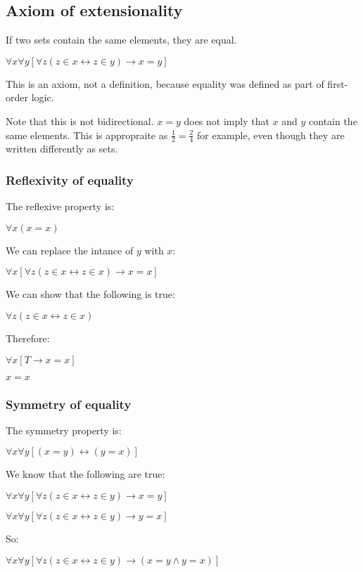
\subsection{Axiom of extensionality}

If two sets contain the same elements, they are equal.

$\forall x \forall y[\forall z(z\in x \leftrightarrow z\in y)\rightarrow x=y]$

This is an axiom, not a definition, because equality was defined as part of first-order logic.

Note that this is not bidirectional. \(x=y\) does not imply that \(x\) and \(y\) contain the same elements. This is appropraite as \(\frac{1}{2}= \frac{2}{4}\) for example, even though they are written differently as sets.

\subsubsection{Reflexivity of equality}

The reflexive property is:

$\forall x(x=x)$

We can replace the intance of \(y\)  with \(x\):

$\forall x [\forall z(z\in x \leftrightarrow z\in x)\rightarrow x=x]$

We can show that the following is true:

$\forall z(z\in x \leftrightarrow z\in x)$

Therefore:

$\forall x [T \rightarrow x=x]$

\(x=x\)

\subsubsection{Symmetry of equality}

The symmetry property is:

$\forall x \forall y[(x=y)\leftrightarrow (y=x)]$

We know that the following are true:

$\forall x \forall y[\forall z(z\in x \leftrightarrow z\in y)\rightarrow x=y]$

$\forall x \forall y[\forall z(z\in x \leftrightarrow z\in y)\rightarrow y=x]$

So:

$\forall x \forall y[\forall z(z\in x \leftrightarrow z\in y)\rightarrow (x=y\land y=x)]$

